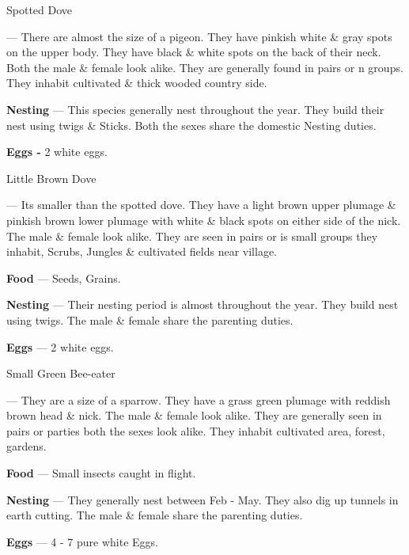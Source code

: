 \begin{bird}{Spotted Dove}

 --- There are almost the size of a pigeon. They have pinkish white \& gray spots on the upper body. They have black \& white spots on the back of their neck. Both the male \& female look alike. They are generally found in pairs or n groups. They inhabit cultivated \& thick wooded country side. 

{\large\bf Nesting} --- This species generally nest throughout the year. They build their nest using twigs \& Sticks. Both the sexes share the domestic Nesting duties.

{\large\bf Eggs -} 2 white eggs.
\end{bird}

\newpage

\begin{bird}{Little Brown Dove}

 --- Its smaller than the spotted dove. They have a light brown upper plumage \& pinkish brown lower plumage with white \& black spots on either side of the nick. The male \& female look alike. They are seen in pairs or is small groups they inhabit, Scrubs, Jungles \& cultivated fields near village. 

{\large\bf Food} --- Seeds, Grains.

{\large\bf Nesting} --- Their nesting period is almost throughout the year. They build nest using twigs. The male \& female share the parenting duties.

{\large\bf Eggs} --- 2 white eggs.
\end{bird}

\begin{bird}{Small Green Bee-eater}

 --- They are a size of a sparrow. They have a grass green plumage with reddish brown head \& nick. The male \& female look alike. They are generally seen in pairs or parties both the sexes look alike. They inhabit cultivated area, forest, gardens.

{\large\bf Food} --- Small insects caught in flight.

{\large\bf Nesting} --- They generally nest between Feb - May. They also dig up tunnels in earth cutting. The male \& female share the parenting duties.

{\large\bf Eggs} --- 4 - 7 pure white Eggs.
\end{bird}

